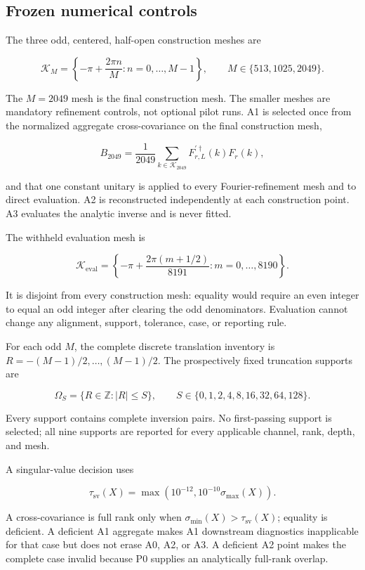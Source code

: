 \documentclass[11pt]{article}
\begin{document}
\subsection{Frozen numerical controls}

The three odd, centered, half-open construction meshes are

\[
\mathcal K_M=\left\{-\pi+\frac{2\pi n}{M}:n=0,\ldots,M-1\right\},
\qquad M\in\{513,1025,2049\}.
\]

The $M=2049$ mesh is the final construction mesh. The smaller meshes are mandatory
refinement controls, not optional pilot runs. A1 is selected once from the normalized
aggregate cross-covariance on the final construction mesh,

\[
B_{2049}=\frac1{2049}\sum_{k\in\mathcal K_{2049}}
F_{r,L}^{\prime\dagger}(k)F_r(k),
\]

and that one constant unitary is applied to every Fourier-refinement mesh and to direct
evaluation. A2 is reconstructed independently at each construction point. A3 evaluates
the analytic inverse and is never fitted.

The withheld evaluation mesh is

\[
\mathcal K_{\mathrm{eval}}=
\left\{-\pi+\frac{2\pi(m+1/2)}{8191}:m=0,\ldots,8190\right\}.
\]

It is disjoint from every construction mesh: equality would require an even integer to
equal an odd integer after clearing the odd denominators. Evaluation cannot change any
alignment, support, tolerance, case, or reporting rule.

For each odd $M$, the complete discrete translation inventory is
$R=-(M-1)/2,\ldots,(M-1)/2$. The prospectively fixed truncation supports are

\[
\Omega_S=\{R\in\mathbb Z:|R|\leq S\},
\qquad S\in\{0,1,2,4,8,16,32,64,128\}.
\]

Every support contains complete inversion pairs. No first-passing support is selected;
all nine supports are reported for every applicable channel, rank, depth, and mesh.

A singular-value decision uses

\[
\tau_{\mathrm{sv}}(X)=
\max\!\left(10^{-12},10^{-10}\sigma_{\max}(X)\right).
\]

A cross-covariance is full rank only when
$\sigma_{\min}(X)>\tau_{\mathrm{sv}}(X)$; equality is deficient. A deficient A1
aggregate makes A1 downstream diagnostics inapplicable for that case but does not erase
A0, A2, or A3. A deficient A2 point makes the complete case invalid because P0 supplies
an analytically full-rank overlap.
\end{document}
